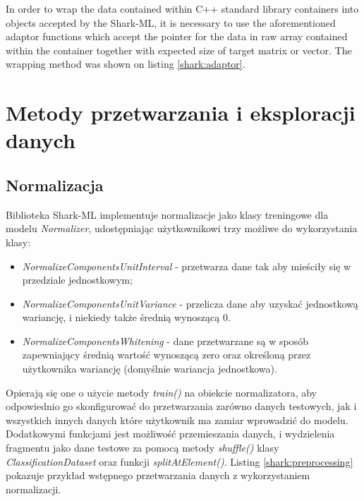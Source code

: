 \newpage
{}

In order to wrap the data contained within C++ standard library containers into objects accepted by the Shark-ML, it is necessary to use the aforementioned adaptor functions which accept the pointer for the data in raw array contained within the container together with expected size of target matrix or vector. The wrapping method was shown on listing \ref{shark:adaptor}. 


\section{Metody przetwarzania i eksploracji danych}

\subsection{Normalizacja}

Biblioteka Shark-ML implementuje normalizacje jako klasy treningowe dla modelu \textit{Normalizer}, udostępniając użytkownikowi trzy możliwe do wykorzystania klasy:

\begin{itemize}
	\item \textit{NormalizeComponentsUnitInterval} - przetwarza dane tak aby mieściły się w przedziale jednostkowym;
	\item \textit{NormalizeComponentsUnitVariance} - przelicza dane aby uzyskać jednostkową wariancję, i niekiedy także średnią wynoszącą 0.
	\item \textit{NormalizeComponentsWhitening} - dane przetwarzane są w sposób zapewniający średnią wartość wynoszącą zero oraz określoną przez użytkownika wariancję (domyślnie wariancja jednostkowa).
\end{itemize}

Opierają się one o użycie metody \textit{train()} na obiekcie normalizatora, aby odpowiednio go skonfigurować do przetwarzania zarówno danych testowych, jak i wszystkich innych danych które użytkownik ma zamiar wprowadzić do modelu. Dodatkowymi funkcjami jest możliwość przemieszania danych, i wydzielenia fragmentu jako dane testowe za pomocą metody \textit{shuffle()} klasy \textit{ClassificationDataset} oraz funkcji \textit{splitAtElement()}. Listing \ref{shark:preprocessing} pokazuje przykład wstępnego przetwarzania danych z wykorzystaniem normalizacji.

